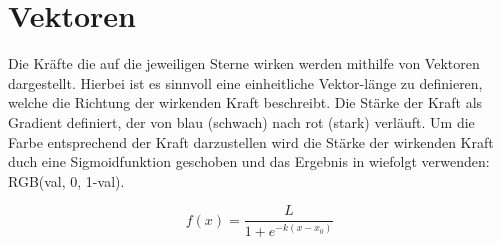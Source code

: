 \section{Vektoren}

Die Kräfte die auf die jeweiligen Sterne wirken werden mithilfe von Vektoren
dargestellt.  Hierbei ist es sinnvoll eine einheitliche Vektor-länge zu
definieren, welche die Richtung der wirkenden Kraft beschreibt. Die Stärke der
Kraft als Gradient definiert, der von blau (schwach) nach rot (stark) verläuft.
Um die Farbe entsprechend der Kraft darzustellen wird die Stärke der wirkenden
Kraft duch eine Sigmoidfunktion geschoben und das Ergebnis in wiefolgt
verwenden: RGB(val, 0, 1-val).

\begin{equation}
f(x) = \frac{L}{1 + e^{-k(x-x_0)}}
\end{equation}

